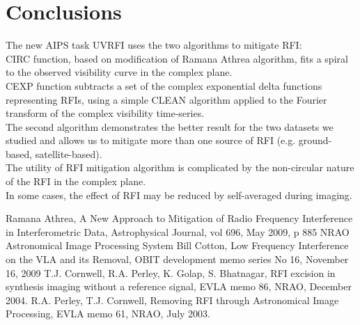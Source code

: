 \documentclass{article}
\begin{document}
\section{Conclusions}
The new AIPS task UVRFI uses the two algorithms to mitigate RFI: \\
CIRC function, based on modification of Ramana Athrea algorithm, fits a
spiral to the observed visibility curve in the complex plane.\\
CEXP function subtracts a set of the complex exponential delta
functions representing RFIs, using a simple CLEAN algorithm applied to
the Fourier transform of the complex visibility time-series. \\
The second algorithm demonstrates the better result for the two datasets
we studied and allows us to mitigate more than one source of RFI
(e.g. ground-based, satellite-based).\\
The utility of RFI mitigation algorithm is complicated by the
non-circular nature of the RFI in the complex plane. \\
In some cases, the effect of RFI may be reduced by self-averaged during imaging.


\begin{thebibliography}{99}
 Ramana Athrea, A New Approach to Mitigation of Radio Frequency Interference in Interferometric Data, Astrophysical Journal, vol 696, May 2009, p 885
 NRAO Astronomical Image Processing System
 Bill Cotton, Low Frequency Interference on the VLA and its Removal,  OBIT development memo series No 16, November 16, 2009
 T.J. Cornwell, R.A. Perley, K. Golap, S. Bhatnagar, RFI excision in synthesis imaging without a reference signal, EVLA memo 86, NRAO, December 2004.
 R.A. Perley, T.J. Cornwell, Removing RFI through Astronomical Image Processing, EVLA memo 61, NRAO, July 2003.
\end{thebibliography}
\end{document}
